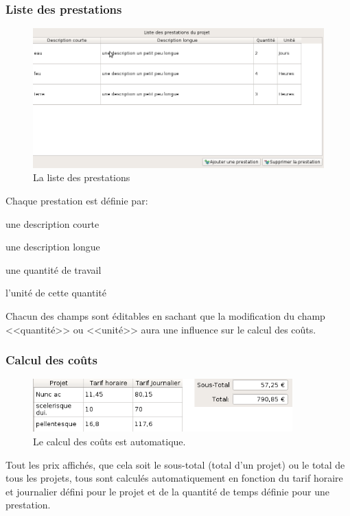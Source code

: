 \subsubsection{Liste des prestations}
\begin{figure}[H]
	\centering
	\includegraphics[width=12cm]{screens/listePrestations.png}
	\caption{La liste des prestations}
	\label{fig:prestation_list}
\end{figure}
Chaque prestation est définie par:
\begin{description}
	\item une description courte
	\item une description longue
	\item une quantité de travail
	\item l'unité de cette quantité
\end{description}
Chacun des champs sont éditables en sachant que la modification du champ <<quantité>> ou <<unité>> aura une influence sur le calcul des coûts.

\subsubsection{Calcul des coûts}
\begin{figure}[H]
	\centering
	\includegraphics[width=10cm]{screens/calculCouts.png}
	\caption{Le calcul des coûts est automatique.}
	\label{fig:compute_costs}
\end{figure}
Tout les prix
affichés, que cela soit le sous-total (total d’un projet) ou le total de tous les projets, tous sont
calculés automatiquement en fonction du tarif horaire et journalier défini pour le projet et de la
quantité de temps définie pour une prestation.

